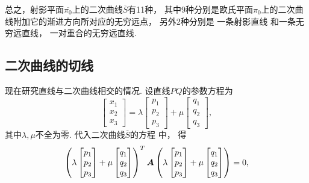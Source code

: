 总之，射影平面\(\overline{\pi_0}\)上的二次曲线\(\overline{S}\)有11种，
其中9种分别是欧氏平面\(\pi_0\)上的二次曲线附加它的渐进方向所对应的无穷远点，
另外2种分别是
一条射影直线  和一条无穷远直线，
一对重合的无穷远直线.

\subsection{二次曲线的切线}
现在研究直线与二次曲线相交的情况.
设直线\(PQ\)的参数方程为\begin{equation}\label{equation:配极.直线的齐次射影坐标方程}
	\begin{bmatrix}
		x_1 \\ x_2 \\ x_3
	\end{bmatrix}
	= \lambda
	\begin{bmatrix}
		p_1 \\ p_2 \\ p_3
	\end{bmatrix}
	+ \mu
	\begin{bmatrix}
		q_1 \\ q_2 \\ q_3
	\end{bmatrix},
\end{equation}
其中\(\lambda,\mu\)不全为零.
代入二次曲线\(\overline{S}\)的方程  中，
得\begin{equation*}
	\left(
		\lambda
		\begin{bmatrix}
			p_1 \\ p_2 \\ p_3
		\end{bmatrix}
		+ \mu
		\begin{bmatrix}
			q_1 \\ q_2 \\ q_3
		\end{bmatrix}
	\right)^T
	\boldsymbol{A}
	\left(
		\lambda
		\begin{bmatrix}
			p_1 \\ p_2 \\ p_3
		\end{bmatrix}
		+ \mu
		\begin{bmatrix}
			q_1 \\ q_2 \\ q_3
		\end{bmatrix}
	\right)
	= 0,
\end{equation*}
